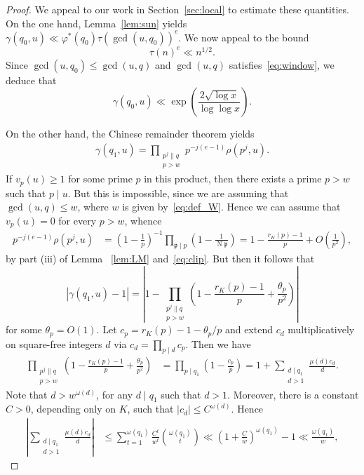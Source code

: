 \documentclass[11pt,letterpaper]{amsart}
\renewcommand{\leq}{\leqslant}
\renewcommand{\geq}{\geqslant}
\theoremstyle{definition}
\numberwithin{equation}{section}
\DeclareMathOperator{\n}{N}
\newcommand{\fp}{\mathfrak{p}}
\newcommand{\0}{\mathbf{0}}
\begin{document}
\begin{proof}
We appeal to our work in Section~\ref{sec:local}
to estimate these quantities. On the one hand, 
Lemma~\ref{lem:sun}
yields
$
\gamma(q_0,u)\ll  \varphi^*(q_0) \tau(\gcd(u,q_0))^e.
$
We now appeal to the bound 
$$
\tau(n)^e\ll n^{1/2}.
$$
Since $\gcd(u,q_0)\leq \gcd(u,q)$ and 
$\gcd(u,q)$ satisfies~\eqref{eq:window}, 
we deduce that 
\begin{equation}\label{eq:shoe2}
\gamma(q_0,u)
\ll \exp\left(\frac{2 \sqrt{\log x}}{\log\log x}\right).
\end{equation}

On the other hand, the Chinese remainder theorem yields
\begin{align*}
\gamma(q_1,u)=
\prod_{\substack{p^j \| q \\ p>w }} 
p^{-j(e-1)}\rho(p^j,u).
\end{align*}
If $v_p(u)\geq 1$ for some prime $p$ in this product, then 
there exists a prime $p>w$ such that $p\mid u$. But this is impossible, since we are assuming that $\gcd(u,q)\leq w$, where $w$ is given by~\eqref{eq:def_W}.  Hence we can assume that $v_p(u)=0$ for every $p>w$, whence
\begin{align*}
p^{-j(e-1)}\rho(p^j,u)&=  
\left(1-\frac{1}{p}\right)^{-1}\prod_{\fp\mid p} \left(1-\frac{1}{\n \fp}\right)
=1-\frac{r_K(p)-1}{p}+O\left(\frac{1}{p^2}\right),
\end{align*}
by part (iii) of Lemma ~\ref{lem:LM} and~\eqref{eq:clip}.
But then it follows that 
$$
\left|\gamma(q_1,u)-1\right|=\left|1-
\prod_{\substack{p^j \| q \\ p>w }}  
\left(1-\frac{r_K(p)-1}{p}+\frac{\theta_p}{p^2}\right)\right|
$$
for some $\theta_p=O(1)$.
Let 
$
c_p=r_K(p)-1-\theta_p/p$ and
extend $c_d$ multiplicatively on square-free integers $d$ via $c_d=\prod_{p\mid d}c_{p}$.
Then we have 
\begin{align*}
\prod_{\substack{p^j \| q \\ p>w }}  
\left(1-\frac{r_K(p)-1}{p}+\frac{\theta_p}{p^2}\right)
&= \prod_{p\mid q_1} \left(1-\frac{c_p}{p}\right)
= 1+\sum_{\substack{d\mid q_1\\ d>1}}\frac{\mu(d)c_d}{d}.
\end{align*}
Note that $d>w^{\omega(d)}$, for any $d\mid q_1$ such that $d>1$.
Moreover, there is a constant $C>0$, depending only on $K$, such that  $|c_d|\leq C^{\omega(d)}$. Hence
\begin{align*}
\left|\sum_{\substack{d\mid q_1\\ d>1}}\frac{\mu(d)c_d}{d}\right|
&\leq \sum_{t=1}^{\omega(q_1)} \frac{C^t}{w^t}\binom{\omega(q_1)}{t}\ll\left(1+\frac{C}{w}\right)^{\omega(q_1)}-1\ll\frac{ \omega(q_1) }{w},

\end{align*}
\end{proof}
\end{document}
